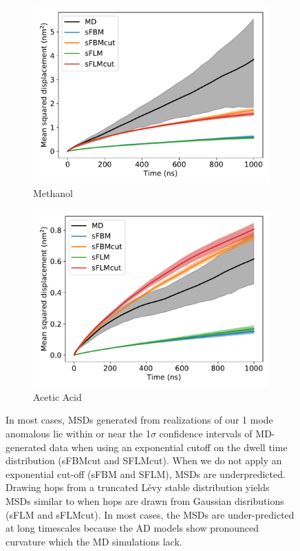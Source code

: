 \documentclass{article}
\begin{document}
\begin{figure}
\begin{subfigure}{0.45\textwidth}
  \includegraphics[width=\textwidth]{1mode_msd_comparison_MET.pdf}
  \caption{Methanol}\label{fig:1mode_msd_comparison_MET}
  \end{subfigure}
  \begin{subfigure}{0.45\textwidth}
  \includegraphics[width=\textwidth]{1mode_msd_comparison_ACH.pdf}
  \caption{Acetic Acid}\label{fig:1mode_msd_comparison_ACH}
  \end{subfigure}
  \caption{In most cases, MSDs generated from realizations of our 1 mode anomalous
  lie within or near the 1$\sigma$ confidence intervals of MD-generated data when using an
  exponential cutoff on the dwell time distribution (sFBMcut and SFLMcut). When we
  do not apply an exponential cut-off (sFBM and SFLM), MSDs are underpredicted. 
  Drawing hops from a truncated L\'evy stable distribution yields MSDs similar to 
  when hops are drawn from Gaussian disributions (sFLM and sFLMcut). In most 
  cases, the MSDs are under-predicted at long timescales because the AD models
  show pronounced curvature which the MD simulations lack.}\label{fig:anomalous_msds_1mode}
  \end{figure}
  
\end{document}
